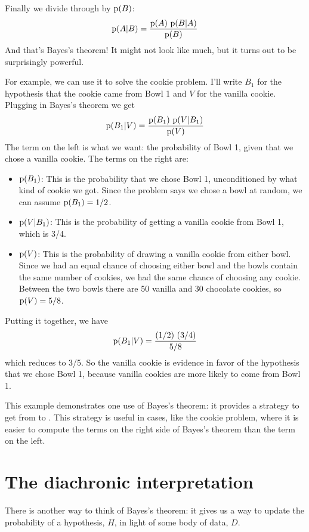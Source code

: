 \documentclass[12pt]{book}
\theoremstyle{exercise}
\begin{document}
Finally we divide through by $\mathrm{p}(B)$:
%
\[ \mathrm{p}(A|B) = \frac{\mathrm{p}(A)~\mathrm{p}(B|A)}{\mathrm{p}(B)} \]
%
And that's Bayes's theorem!  It might not look like much, but
it turns out to be surprisingly powerful.

For example, we can use it to solve the cookie problem.  I'll write
$B_1$ for the hypothesis that the cookie came from Bowl 1
and $V$ for the vanilla cookie.  Plugging in Bayes's theorem
we get
%
\[ \mathrm{p}(B_1|V) = \frac{\mathrm{p}(B_1)~\mathrm{p}(V|B_1)}{\mathrm{p}(V)} \]
%
The term on the left is what we want: the probability of Bowl 1, given
that we chose a vanilla cookie.  The terms on the right are:

\begin{itemize}

\item $\mathrm{p}(B_1)$: This is the probability that we chose Bowl 1, unconditioned by what kind of cookie we got.  Since the problem says we chose a bowl at random, we can assume $\mathrm{p}(B_1) = 1/2$.

\item $\mathrm{p}(V|B_1)$: This is the probability of getting a vanilla cookie
from Bowl 1, which is 3/4.

\item $\mathrm{p}(V)$: This is the probability of drawing a vanilla cookie from
either bowl.  Since we had an equal chance of choosing either bowl
and the bowls contain the same number of cookies, we had the same
chance of choosing any cookie.  Between the two bowls there are
50 vanilla and 30 chocolate cookies, so $\mathrm{p}(V) = 5/8$.

\end{itemize}

Putting it together, we have
%
\[ \mathrm{p}(B_1|V) = \frac{(1/2)~(3/4)}{5/8} \]
%
which reduces to 3/5.  So the vanilla cookie is evidence in favor of
the hypothesis that we chose Bowl 1, because vanilla cookies are more
likely to come from Bowl 1.


This example demonstrates one use of Bayes's theorem: it provides
a strategy to get from  to .  This strategy is useful
in cases, like the cookie problem, where it is easier to compute
the terms on the right side of Bayes's theorem than the term on the
left.


\section{The diachronic interpretation}

There is another way to think of Bayes's theorem: it gives us a
way to update the probability of a hypothesis, $H$, in light of
some body of data, $D$.
\end{document}

